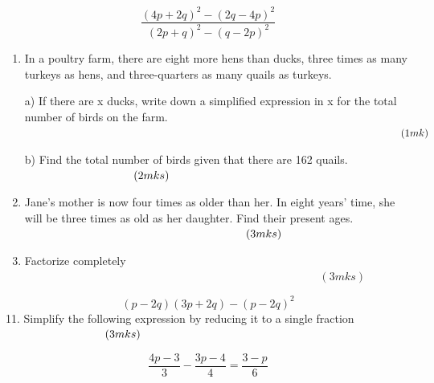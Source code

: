 \documentclass[
  a4paperpaper,
]{scrbook}
\begin{document}
\begin{tcolorbox}
\[\frac{(4p+2q)^2-(2q-4p)^2}{(2p+q)^2-(q-2p)^2} \]

\begin{enumerate}
\def\labelenumi{\arabic{enumi}.}
\setcounter{enumi}{7}
\item
  In a poultry farm, there are eight more hens than ducks, three times
  as many turkeys as hens, and three-quarters as many quails as turkeys.

  a) If there are x ducks, write down a simplified expression in x for
  the total number of birds on the farm. \(\hspace{12.9cm}(1mk)\)

  b) Find the total number of birds given that there are 162 quails.
  \(\hspace{3.4cm}(2mks)\)
\item
  Jane's mother is now four times as older than her. In eight years'
  time, she will be three times as old as her daughter. Find their
  present ages. \(\hspace{6.9cm} (3mks)\)
\item
  Factorize completely \(\hspace{11cm} (3mks)\)
\end{enumerate}

\[
(p-2q)(3p+2q)-(p-2q)^2
\] 11. Simplify the following expression by reducing it to a single
fraction \(\hspace{3.1cm} (3 mks)\)

\[
\frac{4p-3}{3}-\frac{3p-4}{4}=\frac{3-p}{6}
\]


\end{tcolorbox}
\end{document}
